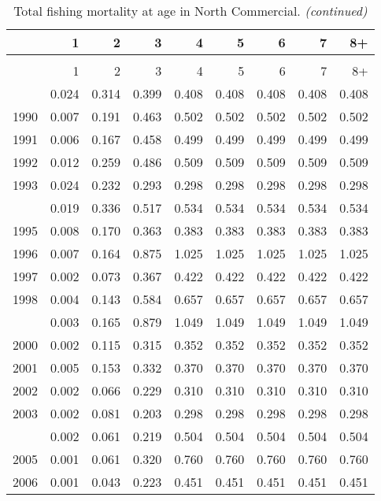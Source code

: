 \documentclass[
]{article}
\begin{document}
\begin{longtable}[t]{lrrrrrrrr}
\caption{\label{tab:North_Commercial-fleet-FAA-table}Total fishing mortality at age in North Commercial.}\\
\toprule
  & 1 & 2 & 3 & 4 & 5 & 6 & 7 & 8+\\
\midrule
\endfirsthead
\caption[]{Total fishing mortality at age in North Commercial. \textit{(continued)}}\\
\toprule
  & 1 & 2 & 3 & 4 & 5 & 6 & 7 & 8+\\
\midrule
\endhead

\endfoot
\bottomrule
\endlastfoot
1989 & 0.024 & 0.314 & 0.399 & 0.408 & 0.408 & 0.408 & 0.408 & 0.408\\
1990 & 0.007 & 0.191 & 0.463 & 0.502 & 0.502 & 0.502 & 0.502 & 0.502\\
1991 & 0.006 & 0.167 & 0.458 & 0.499 & 0.499 & 0.499 & 0.499 & 0.499\\
1992 & 0.012 & 0.259 & 0.486 & 0.509 & 0.509 & 0.509 & 0.509 & 0.509\\
1993 & 0.024 & 0.232 & 0.293 & 0.298 & 0.298 & 0.298 & 0.298 & 0.298\\
\addlinespace
1994 & 0.019 & 0.336 & 0.517 & 0.534 & 0.534 & 0.534 & 0.534 & 0.534\\
1995 & 0.008 & 0.170 & 0.363 & 0.383 & 0.383 & 0.383 & 0.383 & 0.383\\
1996 & 0.007 & 0.164 & 0.875 & 1.025 & 1.025 & 1.025 & 1.025 & 1.025\\
1997 & 0.002 & 0.073 & 0.367 & 0.422 & 0.422 & 0.422 & 0.422 & 0.422\\
1998 & 0.004 & 0.143 & 0.584 & 0.657 & 0.657 & 0.657 & 0.657 & 0.657\\
\addlinespace
1999 & 0.003 & 0.165 & 0.879 & 1.049 & 1.049 & 1.049 & 1.049 & 1.049\\
2000 & 0.002 & 0.115 & 0.315 & 0.352 & 0.352 & 0.352 & 0.352 & 0.352\\
2001 & 0.005 & 0.153 & 0.332 & 0.370 & 0.370 & 0.370 & 0.370 & 0.370\\
2002 & 0.002 & 0.066 & 0.229 & 0.310 & 0.310 & 0.310 & 0.310 & 0.310\\
2003 & 0.002 & 0.081 & 0.203 & 0.298 & 0.298 & 0.298 & 0.298 & 0.298\\
\addlinespace
2004 & 0.002 & 0.061 & 0.219 & 0.504 & 0.504 & 0.504 & 0.504 & 0.504\\
2005 & 0.001 & 0.061 & 0.320 & 0.760 & 0.760 & 0.760 & 0.760 & 0.760\\
2006 & 0.001 & 0.043 & 0.223 & 0.451 & 0.451 & 0.451 & 0.451 & 0.451\\

\end{longtable}
\end{document}

